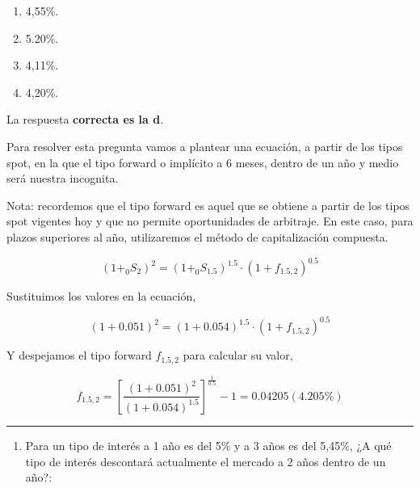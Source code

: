 \documentclass[
  letterpaper,
  DIV=11,
  numbers=noendperiod]{scrreprt}
\providecommand{\tightlist}{%
  \setlength{\itemsep}{0pt}\setlength{\parskip}{0pt}}\usepackage{longtable,booktabs,array}
\begin{document}
\begin{enumerate}
\def\labelenumi{\alph{enumi}.}
\item
  4,55\%.
\item
  5.20\%.
\item
  4,11\%.
\item
  4,20\%.
\end{enumerate}

\begin{tcolorbox}[enhanced jigsaw, left=2mm, opacityback=0, colback=white, breakable, arc=.35mm, bottomrule=.15mm, rightrule=.15mm, toprule=.15mm, leftrule=.75mm, colframe=quarto-callout-tip-color-frame]
\begin{minipage}[t]{5.5mm}
\textcolor{quarto-callout-tip-color}{\faLightbulb}
\end{minipage}%
\begin{minipage}[t]{\textwidth - 5.5mm}

La respuesta \textbf{correcta es la d}.

Para resolver esta pregunta vamos a plantear una ecuación, a partir de
los tipos spot, en la que el tipo forward o implícito a 6 meses, dentro
de un año y medio será nuestra incognita.

Nota: recordemos que el tipo forward es aquel que se obtiene a partir de
los tipos spot vigentes hoy y que no permite oportunidades de arbitraje.
En este caso, para plazos superiores al año, utilizaremos el método de
capitalización compuesta.

\[\left(1+_0S_2\right)^2=\left(1+_{0}S_{1.5}\right)^{1.5}\cdot\left(1+f_{1.5,2}\right)^{0.5}\]

Sustituimos los valores en la ecuación,

\[\left(1+0.051\right)^2=\left(1+0.054\right)^{1.5}\cdot\left(1+f_{1.5,2}\right)^{0.5}\]

Y despejamos el tipo forward \(f_{1.5,2}\) para calcular su valor,

\[f_{1.5,2}=\left[\frac{\left(1+0.051\right)^ 2}{ \left(1+0.054\right)^{1.5}}\right]^{\frac{1 }{0.5 }}-1=0.04205(4.205\%)\]

\end{minipage}%
\end{tcolorbox}

\begin{center}\rule{0.5\linewidth}{0.5pt}\end{center}

\begin{enumerate}
\def\labelenumi{\arabic{enumi}.}
\setcounter{enumi}{40}
\tightlist
\item
  Para un tipo de interés a 1 año es del 5\% y a 3 años es del 5,45\%,
  ¿A qué tipo de interés descontará actualmente el mercado a 2 años
  dentro de un año?:
\end{enumerate}
\end{document}
